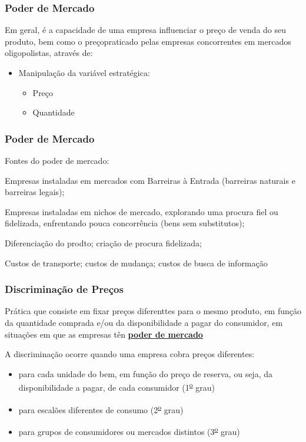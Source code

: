 \begin{frame}
	\frametitle{Poder de Mercado}
	Em geral, \'e a capacidade de uma empresa influenciar o pre\c co de venda do seu produto, bem como o pre\c copraticado pelas empresas concorrentes em mercados oligopolistas, atrav\'es de:
	\begin{itemize}
		\item Manipula\c c\~ao da vari\'avel estrat\'egica:
		\begin{itemize}
			\item Pre\c co
			\item Quantidade
		\end{itemize}
	\end{itemize}
\end{frame}

\begin{frame}
	\frametitle{Poder de Mercado}
	Fontes do poder de mercado:
	\begin{itemize}
		{\footnotesize
		\item Empresas instaladas em mercados com Barreiras \`a Entrada (barreiras naturais e barreiras legais);
		\item Empresas instaladas em nichos de mercado, explorando uma procura fiel ou fidelizada, enfrentando pouca concorr\^encia (bens sem substitutos);
		\item Diferencia\c c\~ao do prodto; cria\c c\~ao de procura fidelizada;
		\item Custos de transporte; custos de mudan\c ca; custos de busca de informa\c c\~ao
		}
	\end{itemize}
\end{frame}

\begin{frame}
	\frametitle{Discrimina\c c\~ao de Pre\c cos}
	Pr\'atica que consiste em fixar pre\c cos diferenttes para o mesmo produto, em fun\c c\~ao da quantidade comprada e/ou da disponibilidade a pagar do consumidor, em situa\c c\~oes em que as empresas t\^en \textbf{\underline{poder de mercado}}\par
	\vspace{0.5cm}
	A discrimina\c c\~ao ocorre quando uma empresa cobra pre\c cos diferentes:
	\begin{itemize}
		\item para cada unidade do bem, em fun\c c\~ao do pre\c co de reserva, ou seja, da disponibilidade a pagar, de cada consumidor (1\textsuperscript{\underline{o}} grau)
		\item para escal\~oes diferentes de consumo (2\textsuperscript{\underline{o}} grau)
		\item para grupos de consumidores ou mercados distintos (3\textsuperscript{\underline{o}} grau)
	\end{itemize}
\end{frame}

